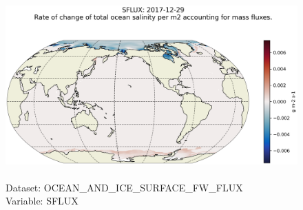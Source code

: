 \begin{figure}[H]
\centering
\includegraphics[scale=0.5]{../images/plots/latlon_plots/Ocean_and_Sea-Ice_Surface_Freshwater_Fluxes/SFLUX.png}
\caption{\\Dataset: OCEAN\_AND\_ICE\_SURFACE\_FW\_FLUX\\Variable: SFLUX}
\label{tab:table-OCEAN_AND_ICE_SURFACE_FW_FLUX_SFLUX-Plot}
\end{figure}
\pagebreak
